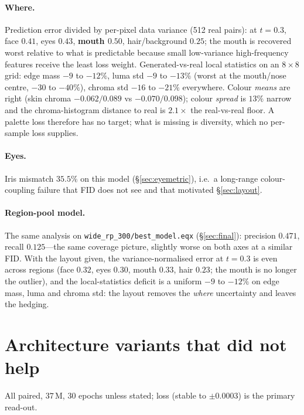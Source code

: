 \documentclass[11pt]{article}
\begin{document}
\paragraph{Where.} Prediction error divided by per-pixel data variance (512 real pairs):
at $t=0.3$, face $0.41$, eyes $0.43$, \textbf{mouth $0.50$}, hair/background $0.25$; the
mouth is recovered worst relative to what is predictable because small low-variance
high-frequency features receive the least loss weight. Generated-vs-real local
statistics on an $8\times8$ grid: edge mass $-9$ to $-12\%$, luma std $-9$ to $-13\%$
(worst at the mouth/nose centre, $-30$ to $-40\%$), chroma std $-16$ to $-21\%$
everywhere. Colour \emph{means} are right (skin chroma $-0.062/0.089$ vs
$-0.070/0.098$); colour \emph{spread} is $13\%$ narrow and the chroma-histogram distance
to real is $2.1\times$ the real-vs-real floor. A palette loss therefore has no target;
what is missing is diversity, which no per-sample loss supplies.

\paragraph{Eyes.} Iris mismatch $35.5\%$ on this model (\S\ref{sec:eyemetric}), i.e.\ a
long-range colour-coupling failure that FID does not see and that motivated
\S\ref{sec:layout}.

\paragraph{Region-pool model.} The same analysis on \texttt{wide\_rp\_300/best\_model.eqx}
(\S\ref{sec:final}): precision $0.471$, recall $0.125$---the same coverage picture,
slightly worse on both axes at a similar FID. With the layout given, the
variance-normalised error at $t=0.3$ is even across regions (face $0.32$, eyes $0.30$,
mouth $0.33$, hair $0.23$; the mouth is no longer the outlier), and the local-statistics
deficit is a uniform $-9$ to $-12\%$ on edge mass, luma and chroma std: the layout
removes the \emph{where} uncertainty and leaves the hedging.

\section{Architecture variants that did not help}\label{sec:arch}

All paired, $37$\,M, 30 epochs unless stated; loss (stable to $\pm0.0003$) is the
primary read-out.
\end{document}
